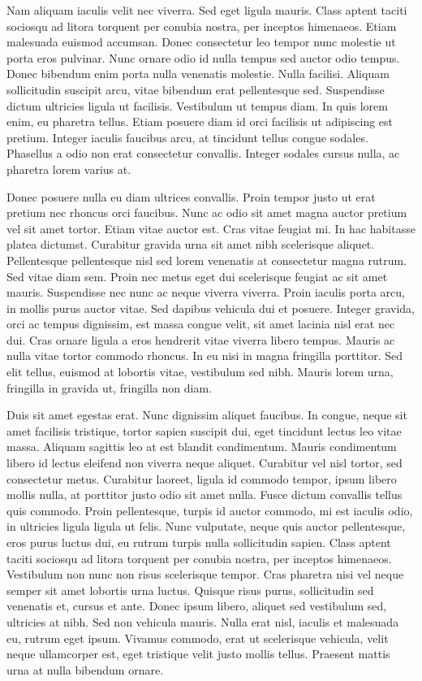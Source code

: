 Nam aliquam iaculis velit nec viverra.
Sed eget ligula mauris.
Class aptent taciti sociosqu ad litora torquent per conubia nostra, per inceptos himenaeos.
Etiam malesuada euismod accumsan.
Donec consectetur leo tempor nunc molestie ut porta eros pulvinar.
Nunc ornare odio id nulla tempus sed auctor odio tempus.
Donec bibendum enim porta nulla venenatis molestie.
Nulla facilisi.
Aliquam sollicitudin suscipit arcu, vitae bibendum erat pellentesque sed.
Suspendisse dictum ultricies ligula ut facilisis.
Vestibulum ut tempus diam.
In quis lorem enim, eu pharetra tellus.
Etiam posuere diam id orci facilisis ut adipiscing est pretium.
Integer iaculis faucibus arcu, at tincidunt tellus congue sodales.
Phasellus a odio non erat consectetur convallis.
Integer sodales cursus nulla, ac pharetra lorem varius at.

Donec posuere nulla eu diam ultrices convallis.
Proin tempor justo ut erat pretium nec rhoncus orci faucibus.
Nunc ac odio sit amet magna auctor pretium vel sit amet tortor.
Etiam vitae auctor est.
Cras vitae feugiat mi.
In hac habitasse platea dictumst.
Curabitur gravida urna sit amet nibh scelerisque aliquet.
Pellentesque pellentesque nisl sed lorem venenatis at consectetur magna rutrum.
Sed vitae diam sem.
Proin nec metus eget dui scelerisque feugiat ac sit amet mauris.
Suspendisse nec nunc ac neque viverra viverra.
Proin iaculis porta arcu, in mollis purus auctor vitae.
Sed dapibus vehicula dui et posuere.
Integer gravida, orci ac tempus dignissim, est massa congue velit, sit amet lacinia nisl erat nec dui.
Cras ornare ligula a eros hendrerit vitae viverra libero tempus.
Mauris ac nulla vitae tortor commodo rhoncus.
In eu nisi in magna fringilla porttitor.
Sed elit tellus, euismod at lobortis vitae, vestibulum sed nibh.
Mauris lorem urna, fringilla in gravida ut, fringilla non diam.

Duis sit amet egestas erat.
Nunc dignissim aliquet faucibus.
In congue, neque sit amet facilisis tristique, tortor sapien suscipit dui, eget tincidunt lectus leo vitae massa.
Aliquam sagittis leo at est blandit condimentum.
Mauris condimentum libero id lectus eleifend non viverra neque aliquet.
Curabitur vel nisl tortor, sed consectetur metus.
Curabitur laoreet, ligula id commodo tempor, ipsum libero mollis nulla, at porttitor justo odio sit amet nulla.
Fusce dictum convallis tellus quis commodo.
Proin pellentesque, turpis id auctor commodo, mi est iaculis odio, in ultricies ligula ligula ut felis.
Nunc vulputate, neque quis auctor pellentesque, eros purus luctus dui, eu rutrum turpis nulla sollicitudin sapien.
Class aptent taciti sociosqu ad litora torquent per conubia nostra, per inceptos himenaeos.
Vestibulum non nunc non risus scelerisque tempor.
Cras pharetra nisi vel neque semper sit amet lobortis urna luctus.
Quisque risus purus, sollicitudin sed venenatis et, cursus et ante.
Donec ipsum libero, aliquet sed vestibulum sed, ultricies at nibh.
Sed non vehicula mauris.
Nulla erat nisl, iaculis et malesuada eu, rutrum eget ipsum.
Vivamus commodo, erat ut scelerisque vehicula, velit neque ullamcorper est, eget tristique velit justo mollis tellus.
Praesent mattis urna at nulla bibendum ornare.

